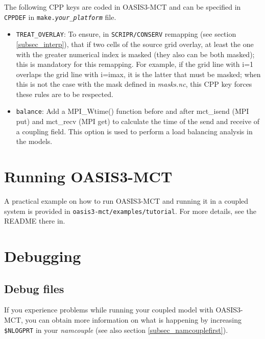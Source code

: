 The following CPP keys are coded in OASIS3-MCT and
can be specified in {\tt CPPDEF} in {\tt make.{\it your\_platform}} file.

\begin{itemize}

\item {\tt TREAT\_OVERLAY}: To ensure, in {\tt SCRIPR/CONSERV} remapping (see section
  \ref{subsec_interp}), that if two cells of the source grid overlay,
  at least the one with the greater numerical index is masked (they
  also can be both masked); this is mandatory for this remapping. For
  example, if the grid line with i=1 overlaps the grid line with
  i=imax, it is the latter that must be masked; when this is not the
  case with the mask defined in {\it masks.nc}, this CPP key forces
  these rules are to be respected.

\item {\tt balance}: Add a MPI\_Wtime() function before and after mct\_isend (MPI put)
   and mct\_recv (MPI get) to calculate the time of the send and receive of a coupling field.
   This option is used to perform a load balancing analysis in the models.
\end{itemize}

\section{Running OASIS3-MCT}
\label{subsec_running}

A practical example on how to run OASIS3-MCT and running it in a
coupled system is provided in {\tt oasis3-mct/examples/tutorial}. For
more details, see the README there in.

\section{Debugging}
\label{subsec_debug}

\subsection{Debug files}
If you experience problems while running your coupled model with
OASIS3-MCT, you can obtain more information on what is happening by increasing {\tt \$NLOGPRT} 
in your {\it namcouple} (see also section \ref{subsec_namcouplefirst}).


